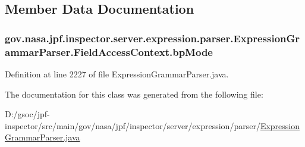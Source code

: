 \subsection{Member Data Documentation}
\subsubsection[{\texorpdfstring{bp\+Mode}{bpMode}}]{ gov.\+nasa.\+jpf.\+inspector.\+server.\+expression.\+parser.\+Expression\+Grammar\+Parser.\+Field\+Access\+Context.\+bp\+Mode}\hypertarget{classgov_1_1nasa_1_1jpf_1_1inspector_1_1server_1_1expression_1_1parser_1_1_expression_grammar_parser_1_1_field_access_context_aae257159483b52a02404cc18b49b69b3}{}\label{classgov_1_1nasa_1_1jpf_1_1inspector_1_1server_1_1expression_1_1parser_1_1_expression_grammar_parser_1_1_field_access_context_aae257159483b52a02404cc18b49b69b3}


Definition at line 2227 of file Expression\+Grammar\+Parser.\+java.



The documentation for this class was generated from the following file\+:\begin{DoxyCompactItemize}
\item 
D\+:/gsoc/jpf-\/inspector/src/main/gov/nasa/jpf/inspector/server/expression/parser/\hyperlink{_expression_grammar_parser_8java}{Expression\+Grammar\+Parser.\+java}\end{DoxyCompactItemize}
